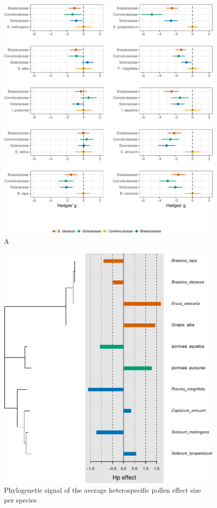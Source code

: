 \documentclass[11pt,a4paper]{article}
\begin{document}
\begin{figure}
\centering
\includegraphics{output/figures/unnamed-chunk-6-1.pdf}
\caption{A}
\end{figure}

\newpage

\begin{figure}
\centering
\includegraphics{output/figures/unnamed-chunk-7-1.pdf}
\caption{Phylogenetic signal of the average heterospecific pollen effect
size per species}
\end{figure}
\end{document}
